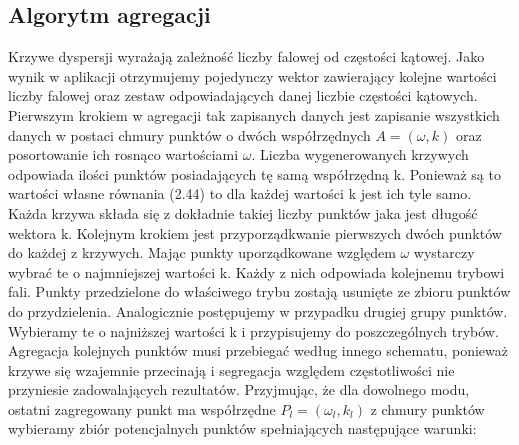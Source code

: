 \subsection{Algorytm agregacji}
 Krzywe dyspersji wyrażają zależność liczby falowej od częstości kątowej. Jako wynik w aplikacji otrzymujemy pojedynczy wektor zawierający kolejne wartości liczby falowej oraz zestaw odpowiadających danej liczbie częstości kątowych. Pierwszym krokiem w agregacji tak zapisanych danych jest zapisanie wszystkich danych w postaci chmury punktów o dwóch współrzędnych $A=(\omega , k)$ oraz posortowanie ich rosnąco wartościami $\omega$. Liczba wygenerowanych krzywych odpowiada ilości punktów posiadających tę samą współrzędną k. Ponieważ są to wartości własne równania (2.44) to dla każdej wartości k jest ich tyle samo. Każda krzywa składa się z dokładnie takiej liczby punktów jaka jest długość wektora k. Kolejnym krokiem jest przyporządkwanie pierwszych dwóch punktów do każdej z krzywych. Mając punkty uporządkowane względem $\omega$ wystarczy wybrać te o najmniejszej wartości k. Każdy z nich odpowiada kolejnemu trybowi fali. Punkty przedzielone do właściwego trybu zostają usunięte ze zbioru punktów do przydzielenia. Analogicznie postępujemy w przypadku drugiej grupy punktów. Wybieramy te o najniższej wartości k i przypisujemy do poszczególnych trybów. Agregacja kolejnych punktów musi przebiegać według innego schematu, ponieważ krzywe się wzajemnie przecinają i segregacja względem częstotliwości nie przyniesie zadowalających rezultatów. Przyjmując, że dla dowolnego modu, ostatni zagregowany punkt ma współrzędne $P_l = (\omega _l,k_l)$ z chmury punktów wybieramy zbiór potencjalnych punktów spełniających następujące warunki:
